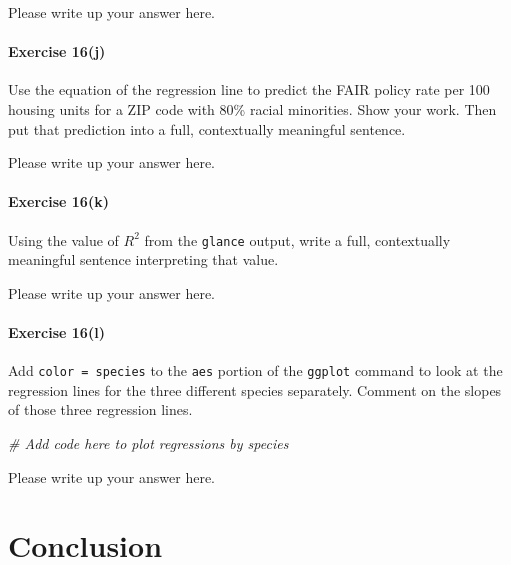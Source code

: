 \documentclass[
]{book}
\newenvironment{Shaded}{\begin{snugshade}}{\end{snugshade}}
\newcommand{\CommentTok}[1]{\textcolor[rgb]{0.56,0.35,0.01}{\textit{#1}}}
\begin{document}
Please write up your answer here.

\hypertarget{exercise-16j}{%
\paragraph*{Exercise 16(j)}\label{exercise-16j}}

Use the equation of the regression line to predict the FAIR policy rate per 100 housing units for a ZIP code with 80\% racial minorities. Show your work. Then put that prediction into a full, contextually meaningful sentence.

Please write up your answer here.

\hypertarget{exercise-16k}{%
\paragraph*{Exercise 16(k)}\label{exercise-16k}}

Using the value of \(R^2\) from the \texttt{glance} output, write a full, contextually meaningful sentence interpreting that value.

Please write up your answer here.

\hypertarget{exercise-16l}{%
\paragraph*{Exercise 16(l)}\label{exercise-16l}}

Add \texttt{color\ =\ species} to the \texttt{aes} portion of the \texttt{ggplot} command to look at the regression lines for the three different species separately. Comment on the slopes of those three regression lines.

\begin{Shaded}
\begin{Highlighting}[]
\CommentTok{\# Add code here to plot regressions by species}
\end{Highlighting}
\end{Shaded}

Please write up your answer here.

\hypertarget{regression-conclusion}{%
\section{Conclusion}\label{regression-conclusion}}
\end{document}
